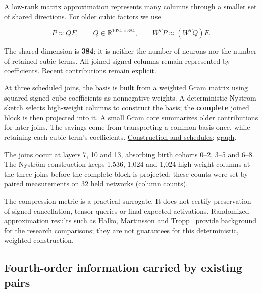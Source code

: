 \documentclass[11pt,letterpaper]{article}
\begin{document}
A low-rank matrix approximation represents many columns through a smaller set of shared directions. For older cubic factors we use

\begin{equation}
P\approx QF,\qquad Q\in\mathbb R^{1024\times384},\qquad
W^TP\approx(W^TQ)F.
\end{equation}

The shared dimension is \textbf{384}; it is neither the number of neurons nor the number of retained cubic terms. All joined signed columns remain represented by coefficients. Recent contributions remain explicit.

At three scheduled joins, the basis is built from a weighted Gram matrix using squared signed-cube coefficients as nonnegative weights. A deterministic Nyström sketch selects high-weight columns to construct the basis; the \textbf{complete} joined block is then projected into it. A small Gram core summarizes older contributions for later joins. The savings come from transporting a common basis once, while retaining each cubic term's coefficients. \href{https://github.com/mattliston/arc-whitebox-estimation-challenge/blob/main/estimator/ANATOMY.md\#third--and-fourth-order-carriers}{Construction and schedules}; \href{https://mattliston.github.io/arc-whitebox-estimation-challenge/\#node=dev-shared-basis&view=map}{graph}.

The joins occur at layers 7, 10 and 13, absorbing birth cohorts 0--2, 3--5 and 6--8. The Nyström construction keeps 1,536, 1,024 and 1,024 high-weight columns at the three joins before the complete block is projected; these counts were set by paired measurements on 32 held networks (\href{https://github.com/mattliston/arc-whitebox-estimation-challenge/blob/main/experiments/join-sketch/heavy-column-sketch-squeezed-1536-1024-1024-0-04/README.md}{column counts}).

The compression metric is a practical surrogate. It does not certify preservation of signed cancellation, tensor queries or final expected activations. Randomized approximation results such as Halko, Martinsson and Tropp~\cite{ref-halko} provide background for the research comparisons; they are not guarantees for this deterministic, weighted construction.

\subsection{Fourth-order information carried by existing pairs}\label{fourth-order-information-carried-by-existing-pairs}
\end{document}
